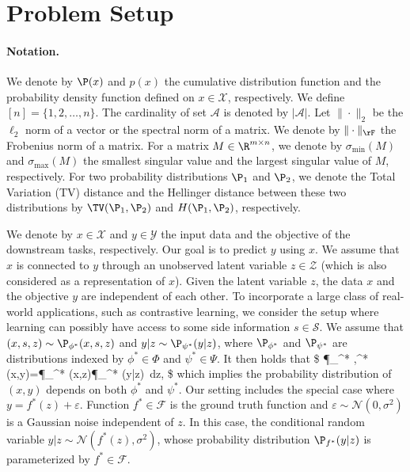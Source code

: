 \section{Problem Setup} \label{sec:prob_setup}

\paragraph{Notation.} We denote by $\P(x)$ and $p(x)$ the cumulative distribution function and the probability density function defined on $x\in\mathcal{X}$, respectively. We define $[n]=\{1,2,\ldots,n\}$. The cardinality of set $\mathcal{A}$ is denoted by $|\mathcal{A}|$. Let $\|\cdot\|_2$ be the $\ell_2$ norm of a vector or the spectral norm of a matrix. We denote by $\|\cdot\|_{\rF}$ the Frobenius norm of a matrix. For a matrix $M\in\R^{m\times n}$, we denote by $\sigma_{\min}(M)$ and $\sigma_{\max}(M)$ the smallest singular value and the largest singular value of $M$, respectively. For two probability distributions $\P_1$ and $\P_2$, we denote the Total Variation (TV) distance and the Hellinger distance between these two distributions by $\TV(\P_1,\P_2)$ and $H(\P_1,\P_2)$, respectively. 


We denote by $x\in\mathcal{X}$ and $y\in\mathcal{Y}$ the input data and the objective of the downstream tasks, respectively. Our goal is to predict $y$ using $x$. We assume that $x$ is connected to $y$ through an unobserved latent variable $z\in\mathcal{Z}$ (which is also considered as a representation of $x$). Given the latent variable $z$, the data $x$ and the objective $y$ are independent of each other. To incorporate a large class of real-world applications, such as contrastive learning, we consider the setup where learning can possibly have access to some side information $s\in\mathcal{S}$. We assume that $(x,s,z)\sim\P_{\phi^* }(x,s,z)$ and $y|z\sim\P_{\psi^* }(y|z)$, where $\P_{\phi^* }$ and $\P_{\psi^* }$ are distributions 
indexed by $\phi^* \in\Phi$ and $\psi^* \in\Psi$. It then holds that 
\$
\P_{\phi^* ,\psi^* }(x,y)=\int \P_{\phi^* }(x,z)\P_{\psi^* }(y|z)\, dz,
\$ 
which implies the probability distribution of $(x,y)$ depends on both $\phi^* $ and $\psi^* $. Our setting includes the special case where $y=f^* (z)+\varepsilon$. Function $f^* \in\mathcal{F}$ is the ground truth function  and $\varepsilon\sim\mathcal{N}(0,\sigma^2)$ is a Gaussian noise independent of $z$. In this case, the conditional random variable $y|z\sim\mathcal{N}(f^* (z),\sigma^2)$, whose probability distribution $\P_{f^* }(y|z)$ is parameterized by $f^* \in\mathcal{F}$.



